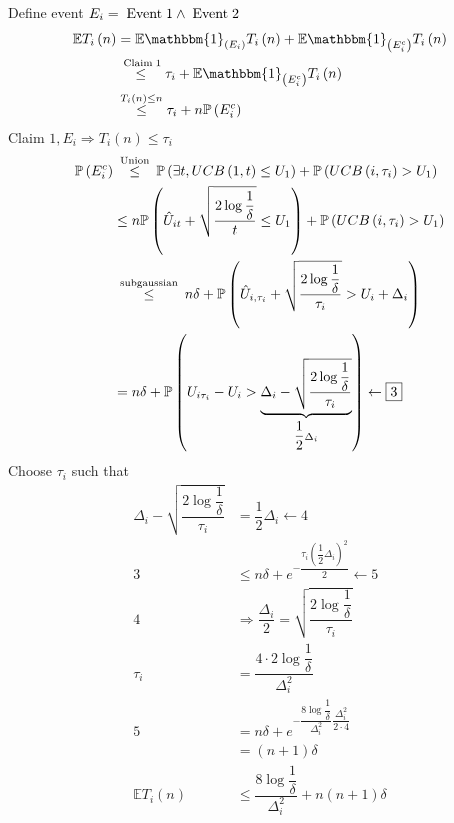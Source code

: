 \documentclass{article}
\begin{document}
Define event $E_{i} = \text{\;Event\;} 1 \wedge \text{\;Event\;} 2$
\begin{align*}
\mathbb{E} T_{i}\left(n\right) &= \mathbb{E} \mathbbm{1}_{\left(E_{i}\right)} T_{i}\left(n\right) + \mathbb{E} \mathbbm{1}_{\left(E_{i}^{c}\right)} T_{i}\left(n\right)
\\ &\stackrel{\text{\;Claim\;} 1}{\leq} \tau_{i} + \mathbb{E} \mathbbm{1}_{\left(E_{i}^{c}\right)} T_{i}\left(n\right)
\\ &\stackrel{T_{i}\left(n\right) \leq  n}{\leq} \tau_{i} + n \mathbb{P}\left(E_{i}^{c}\right)
\end{align*}
Claim $1, E_{i} \Rightarrow  T_{i}\left(n\right) \leq  \tau_{i}$
\begin{align*}
\mathbb{P}\left(E_{i}^{c}\right) &\stackrel{\text{\;Union\;}}{\leq} \mathbb{P}\left(\exists t, UCB\left(1, t\right)  \leq  U_{1}\right) + \mathbb{P}\left(UCB\left(i, \tau_{i}\right)  > U_{1}\right)
\\ &\leq  n \mathbb{P}\left(\hat{U}_{i t} + \sqrt{\dfrac{2 \log \dfrac{1}{\delta}}{t}} \leq  U_{1}\right) + \mathbb{P}\left(UCB\left(i, \tau_{i}\right)  > U_{1}\right)
\\ &\stackrel{\text{\;subgaussian\;}}{\leq} n \delta + \mathbb{P}\left(\hat{U}_{i, \tau_{i}} + \sqrt{\dfrac{2 \log \dfrac{1}{\delta}}{\tau_{i}}} > U_{i} + \Delta_{i}\right)
\\ &= n \delta + \mathbb{P}\left(U_{i \tau_{i}} - U_{i} > \underbrace{\Delta_{i} - \sqrt{\dfrac{2 \log \dfrac{1}{\delta}}{\tau_{i}}}}_{\dfrac{1}{2} \Delta_{i}}\right) \leftarrow \boxed{3}
\end{align*}
Choose $\tau_{i}$ such that
\begin{align*}
\Delta_{i} - \sqrt{\dfrac{2 \log \dfrac{1}{\delta}}{\tau_{i}}} &= \dfrac{1}{2} \Delta_{i} \leftarrow \boxed{4}
\\ \boxed{3} &\leq  n \delta + e^{- \dfrac{\tau_{i} \left(\dfrac{1}{2} \Delta_{i}\right)^{2}}{2}} \leftarrow \boxed{5}
\\ \boxed{4} &\Rightarrow  \dfrac{\Delta_{i}}{2} = \sqrt{\dfrac{2 \log \dfrac{1}{\delta}}{\tau_{i}}}
\\ \tau_{i} &= \dfrac{4 \cdot  2 \log \dfrac{1}{\delta}}{\Delta_{i}^{2}}
\\ \boxed{5} &= n \delta + e^{- \dfrac{8 \log \dfrac{1}{\delta}}{\Delta_{i}^{2}} \dfrac{\Delta_{i}^{2}}{2 \cdot  4}}
\\ &= \left(n + 1\right) \delta
\\ \mathbb{E} T_{i}\left(n\right) &\leq  \dfrac{8 \log \dfrac{1}{\delta}}{\Delta_{i}^{2}} + n \left(n + 1\right) \delta
\end{align*}
\end{document}
